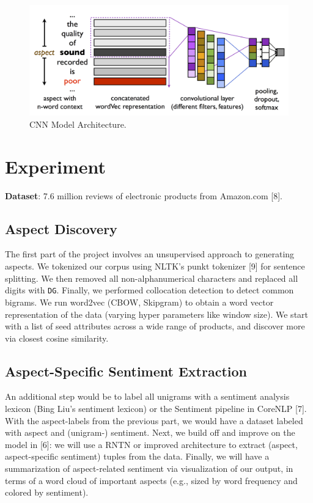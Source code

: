 \documentclass{article} %
\begin{document}
\begin{figure}[ht]
\begin{center}
\includegraphics[width=\columnwidth]{model_architecture.png}
\end{center}
\caption{CNN Model Architecture.}
\label{architecture}
\end{figure}


\section{Experiment} 

\textbf{Dataset}: 7.6 million reviews of electronic products from Amazon.com [8].



\subsection{Aspect Discovery}

The first part of the project involves an unsupervised approach to generating aspects. We tokenized our corpus using NLTK's punkt tokenizer [9] for sentence splitting. We then removed all non-alphanumerical characters and replaced all digits with \texttt{DG}. Finally, we performed collocation detection to detect common bigrams. We run word2vec (CBOW, Skipgram) to obtain a word vector representation of the data (varying hyper parameters like window size). We start with a list of seed attributes across a wide range of products, and discover more via closest cosine similarity.

\subsection{Aspect-Specific Sentiment Extraction}

An additional step would be to label all unigrams with a sentiment analysis lexicon (Bing Liu's sentiment lexicon) or the Sentiment pipeline in CoreNLP [7]. With the aspect-labels from the previous part, we would have a dataset labeled with aspect and (unigram-) sentiment. Next, we build off and improve on the model in [6]: we will use a RNTN or improved architecture to extract (aspect, aspect-specific sentiment) tuples from the data. Finally, we will have a summarization of aspect-related sentiment via visualization of our output, in terms of a word cloud of important aspects (e.g., sized by word frequency and colored by sentiment). 
\end{document}
